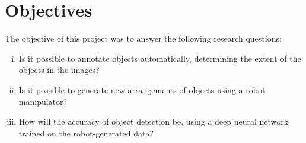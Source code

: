 \section{Objectives}
The objective of this project was to answer the following research questions:
\begin{enumerate}[i.]
    \item Is it possible to annotate objects automatically,  determining the extent of the objects in the images?
    \item Is it possible to generate new arrangements of objects using a robot manipulator?
    \item How will the accuracy of object detection be, using a deep neural network trained on the robot-generated data?
\end{enumerate}